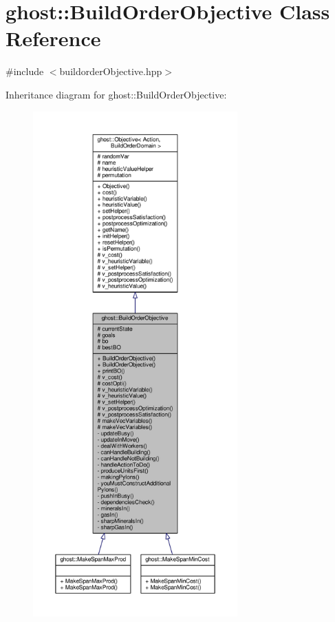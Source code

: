 \hypertarget{classghost_1_1BuildOrderObjective}{\section{ghost\-:\-:Build\-Order\-Objective Class Reference}
\label{classghost_1_1BuildOrderObjective}
}


{\ttfamily \#include $<$buildorder\-Objective.\-hpp$>$}



Inheritance diagram for ghost\-:\-:Build\-Order\-Objective\-:
\nopagebreak
\begin{figure}[H]
\begin{center}
\leavevmode
\includegraphics[height=550pt]{classghost_1_1BuildOrderObjective__inherit__graph}
\end{center}
\end{figure}


